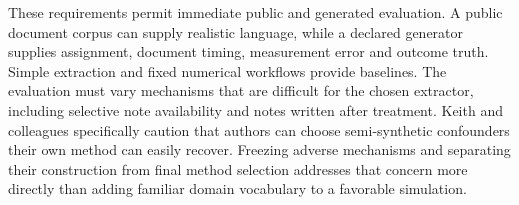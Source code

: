 These requirements permit immediate public and generated evaluation. A
public document corpus can supply realistic language, while a declared
generator supplies assignment, document timing, measurement error and
outcome truth. Simple extraction and fixed numerical workflows provide
baselines. The evaluation must vary mechanisms that are difficult for
the chosen extractor, including selective note availability and notes
written after treatment. Keith and colleagues specifically caution that
authors can choose semi-synthetic confounders their own method can
easily recover. Freezing adverse mechanisms and separating their
construction from final method selection addresses that concern more
directly than adding familiar domain vocabulary to a favorable
simulation. \citep{exec13_census_text_review_arxiv}

\label{exec13:census-measurement-end}
